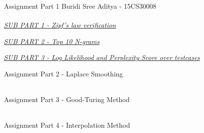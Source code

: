 \documentclass[11ppt]{article}
\begin{document}
{\rmfamily\mdseries\Large Assignment Part 1 \hfill Buridi Sree Aditya - 15CS30008}\\
\hrulefill \\
\vspace{3mm}
\textit{\underline{SUB PART 1 - Zipf's law verification}}\\
\vspace{3mm}

\vspace{3mm}
\textit{\underline{SUB PART 2 - Top 10 N-grams}}\\
\vspace{3mm}

\vspace{3mm}
\textit{\underline{SUB PART 3 - Log Likelihood and Perplexity Score over testcases}}\\
\vspace{3mm}

\vspace{4mm}

{\rmfamily\mdseries\Large Assignment Part 2 - Laplace Smoothing}\\
\hrulefill \\
\vspace{3mm}

\vspace{4mm}


{\rmfamily\mdseries\Large Assignment Part 3 - Good-Turing Method}\\
\hrulefill \\
\vspace{3mm}

\vspace{4mm}
{\rmfamily\mdseries\Large Assignment Part 4 - Interpolation Method}\\
\hrulefill \\
\vspace{3mm}
\end{document}
